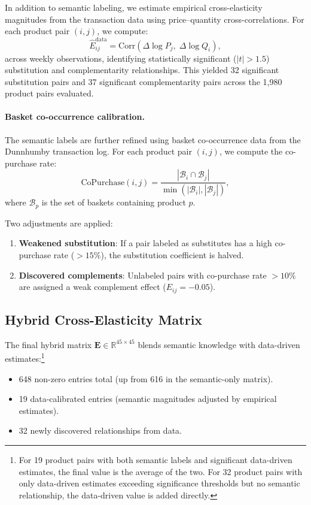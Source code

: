 \documentclass[11pt,a4paper]{article}
\begin{document}
In addition to semantic labeling, we estimate empirical cross-elasticity magnitudes from the transaction data using price--quantity cross-correlations.
For each product pair $(i, j)$, we compute:
\begin{equation}
\hat{E}_{ij}^{\text{data}} = \text{Corr}\!\left(\Delta \log P_j,\;\Delta \log Q_i\right),
\end{equation}
across weekly observations, identifying statistically significant ($|t| > 1.5$) substitution and complementarity relationships.
This yielded 32 significant substitution pairs and 37 significant complementarity pairs across the 1,980 product pairs evaluated.

\paragraph{Basket co-occurrence calibration.}
The semantic labels are further refined using basket co-occurrence data from the Dunnhumby transaction log.
For each product pair $(i, j)$, we compute the co-purchase rate:
\begin{equation}
\text{CoPurchase}(i, j) = \frac{|\mathcal{B}_i \cap \mathcal{B}_j|}{\min(|\mathcal{B}_i|, |\mathcal{B}_j|)},
\end{equation}
where $\mathcal{B}_p$ is the set of baskets containing product $p$.

Two adjustments are applied:
\begin{enumerate}
    \item \textbf{Weakened substitution}: If a pair labeled as substitutes has a high co-purchase rate ($> 15\%$), the substitution coefficient is halved.
    \item \textbf{Discovered complements}: Unlabeled pairs with co-purchase rate $> 10\%$ are assigned a weak complement effect ($E_{ij} = -0.05$).
\end{enumerate}

\subsection{Hybrid Cross-Elasticity Matrix}

The final hybrid matrix $\mathbf{E} \in \mathbb{R}^{45 \times 45}$ blends semantic knowledge with data-driven estimates:\footnote{For 19 product pairs with both semantic labels and significant data-driven estimates, the final value is the average of the two.
For 32 product pairs with only data-driven estimates exceeding significance thresholds but no semantic relationship, the data-driven value is added directly.}
\begin{itemize}
    \item 648 non-zero entries total (up from 616 in the semantic-only matrix).
    \item 19 data-calibrated entries (semantic magnitudes adjusted by empirical estimates).
    \item 32 newly discovered relationships from data.
\end{itemize}
\end{document}
